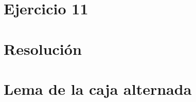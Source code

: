 \documentclass{article}
\begin{document}
    

    \section*{Ejercicio 11}
        

    \newpage
    \section*{Resolución}
        

    \newpage
    \section*{Lema de la caja alternada}
        
\end{document}
